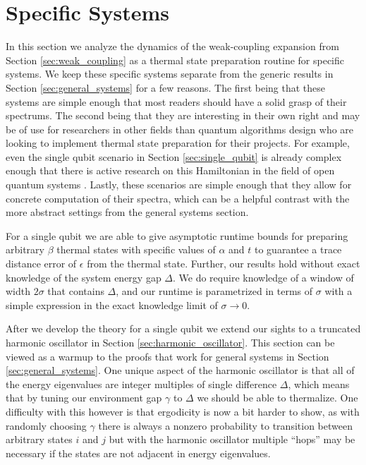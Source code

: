 \documentclass[
 amsmath,amssymb,
 aps,
onecolumn, 
nofootinbib]{revtex4-2}
\begin{document}
\section{Specific Systems} \label{sec:specific_systems}
In this section we analyze the dynamics of the weak-coupling expansion from Section \ref{sec:weak_coupling} as a thermal state preparation routine for specific systems. We keep these specific systems separate from the generic results in Section \ref{sec:general_systems} for a few reasons. The first being that these systems are simple enough that most readers should have a solid grasp of their spectrums. The second being that they are interesting in their own right and may be of use for researchers in other fields than quantum algorithms design who are looking to implement thermal state preparation for their projects. For example, even the single qubit scenario in Section \ref{sec:single_qubit} is already complex enough that there is active research on this Hamiltonian in the field of open quantum systems \cite{prositto2025equilibrium}. Lastly, these scenarios are simple enough that they allow for concrete computation of their spectra, which can be a helpful contrast with the more abstract settings from the general systems section.

For a single qubit we are able to give asymptotic runtime bounds for preparing arbitrary $\beta$ thermal states with specific values of $\alpha$ and $t$ to guarantee a trace distance error of $\epsilon$ from the thermal state. Further, our results hold without exact knowledge of the system energy gap $\Delta$. We do require knowledge of a window of width $2 \sigma$ that contains $\Delta$, and our runtime is parametrized in terms of $\sigma$ with a simple expression in the exact knowledge limit of $\sigma \to 0$.

After we develop the theory for a single qubit we extend our sights to a truncated harmonic oscillator in Section \ref{sec:harmonic_oscillator}. This section can be viewed as a warmup to the proofs that work for general systems in Section \ref{sec:general_systems}. One unique aspect of the harmonic oscillator is that all of the energy eigenvalues are integer multiples of single difference $\Delta$, which means that by tuning our environment gap $\gamma$ to $\Delta$ we should be able to thermalize. One difficulty with this however is that ergodicity is now a bit harder to show, as with randomly choosing $\gamma$ there is always a nonzero probability to transition between arbitrary states $i$ and $j$ but with the harmonic oscillator multiple ``hops'' may be necessary if the states are not adjacent in energy eigenvalues.
\end{document}
